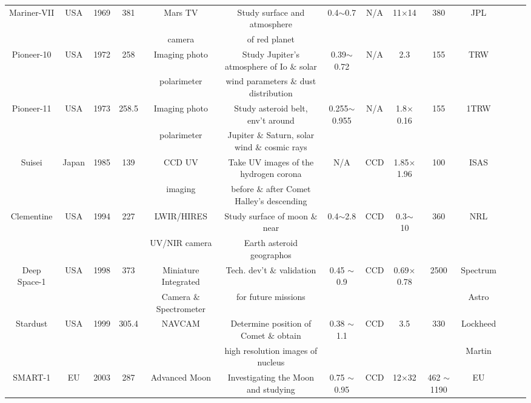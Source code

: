 \documentclass[final,5p,times,twocolumn]{elsarticle}
\begin{document}
\begin{table}
{\begin{tabular}{c c c c c c c c c c c c c c}
			Mariner-VII & USA & 1969 & 381 & Mars TV & Study surface and atmosphere  & 0.4$\sim$0.7 & N/A & 11$\times$14 & 380 & JPL & \citep{siddiqi2018beyond, Henin2021ImagingOS}\\
			& & & & camera & of red planet & & & & & & & \\
			Pioneer-10 & USA & 1972& 258 & Imaging photo & Study Jupiter's atmosphere of Io $\&$ solar  & 0.39$\sim$0.72 & N/A & 2.3 & 155 & TRW & \citep{siddiqi2018beyond, gehrels1974imaging}\\
			& & & & polarimeter & wind parameters $\&$ dust distribution & & & & & & &\\
			Pioneer-11 & USA & 1973 & 258.5 & Imaging photo & Study asteroid belt, env't around  & 0.255$\sim$0.955 & N/A & 1.8$\times$0.16 & 155 & 1TRW & \citep{siddiqi2018beyond, fimmel1977pioneer}\\
			& & & & polarimeter & Jupiter $\&$ Saturn, solar wind $\&$ cosmic rays & & & & & & & &\\
			Suisei & Japan & 1985 & 139 & CCD UV  & Take UV images of the hydrogen corona & N/A & CCD & 1.85$\times$1.96 & 100 &  ISAS & \citep{siddiqi2018beyond, Henin2021ImagingOS}\\
			& & & & imaging & before $\&$ after Comet Halley's descending & & & & & & &\\
			Clementine & USA & 1994 & 227 & LWIR/HIRES & Study surface of moon $\&$ near  & 0.4$\sim$2.8 & CCD & 0.3$\sim$10 & 360 &  NRL & \citep{siddiqi2018beyond, nozette1994clementine}\\
			& & & & UV/NIR camera & Earth asteroid geographos & & & & & & &\\
			Deep Space-1 & USA & 1998 & 373 & Miniature Integrated & Tech. dev't $\&$ validation  & 0.45 $\sim$ 0.9 & CCD & 0.69$\times$0.78 &2500 &  Spectrum & \citep{rodgers2007advanced, siddiqi2018beyond}\\
			& & & & Camera $\&$ Spectrometer &  for future missions & & & &  &  Astro&\\
			Stardust & USA & 1999 & 305.4 & NAVCAM & Determine position of Comet $\&$ obtain & 0.38 $\sim$ 1.1 & CCD & 3.5 & 330 & Lockheed & \citep{siddiqi2018beyond, sandford2006organics}\\
			& & & & & high resolution images of nucleus & & & & &  Martin &\\
			SMART-1 & EU & 2003 & 287 & Advanced Moon & Investigating the Moon and studying  & 0.75 $\sim$ 0.95 & CCD & 12$\times$32 & 462 $\sim$ 1190 & EU & \citep{racca2002smart, Henin2021ImagingOS}\\

\end{tabular}}
\end{table}
\end{document}
